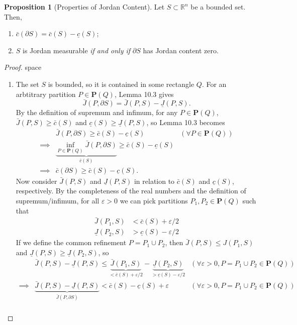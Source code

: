 \documentclass{article}
\newcommand{\R}{\mathbb{R}}
\theoremstyle{definition}
\newtheorem{proposition}{Proposition}[section]
\begin{document}
	\begin{proposition}[Properties of Jordan Content]
		Let $S\subset \R^n$ be a bounded set. Then,
		\begin{enumerate}
			\item  $ \bar c(\partial S) = \bar c(S)-\underline c(S) $;
			\item  $ S $ is Jordan measurable \textit{if and only if} $ \partial S $ has Jordan content zero.
		\end{enumerate}
	\end{proposition}
\begin{proof}{\color{white}space}
	\begin{enumerate}
		\item The set $S$ is bounded, so it is contained in some rectangle $Q$. For an arbtitrary partition $P \in \mathbf P(Q)$, Lemma 10.3 gives 
		$$\bar J(P,\partial S)  =  	\bar J(P,S) - \underline J(P,S).$$
		By the definition of supremum and infimum, for any $P\in \mathbf P(Q)$, $\bar J(P,S) \ge \bar c(S)$ and $\underline c(S) \ge \underline J(P,S)$, so Lemma 10.3 becomes 
		\begin{align*}
		&	\bar J(P,\partial S)  \ge \bar c(S) - \underline c(S) & (\forall P\in \mathbf P(Q))\\
		\implies& \underbrace{ \inf_{P\in \textbf{P}(Q)}\bar J(P,\partial S)}_{\bar c(S)}  \ge \bar c(S) - \underline c(S) \\
		\implies &  \bar c(\partial S)\ge \bar c(S) - \underline c(S) .
		\end{align*}
		Now consider $\bar J(P,S)$ and $\underline J(P,S)$ in relation to $ \bar c(S)$ and $\underline c(S)$, respectively. By the completeness of the real numbers and the definition of supremum/infimum, for all $\varepsilon > 0$ we can pick partitions $P_1, P_2\in \mathbf P(Q)$ such that
		\begin{align*}
			\bar J(P_1,S)& < \bar c(S) + \varepsilon/2\\
			\underline J(P_2,S) & >\underline c(S) - \varepsilon/2
		\end{align*}
		If we define the common refinement $P= P_1\cup P_2$, then $\bar J(P,S) \le J(P_1, S)$ and $\underline J(P,S) \ge \underline J(P_2, S)$, so 
		\begin{align*}
		&	\bar J(P,S) - \underline J(P,S) \le \underbrace{\bar J(P_1, S)}_{< \bar c(S) + \varepsilon/2} -  \underbrace{\underline J(P_2, S)}_{> \underline c(S) - \varepsilon/2} & (\forall \varepsilon > 0,P = P_1\cup P_2\in \mathbf P(Q))\\
		\implies & \underbrace{\bar J(P,S) - \underline J(P,S)}_{\bar J(P,\partial S) } < \bar c(S) - \underline c(S) + \varepsilon & (\forall \varepsilon > 0,P = P_1\cup P_2\in \mathbf P(Q))\\

\end{align*}
\end{enumerate}
\end{proof}
\end{document}
